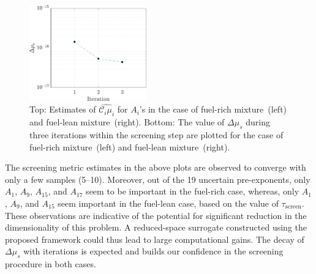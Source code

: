 \begin{figure}[htbp]
\begin{center}
  \includegraphics[width=0.45\textwidth]{./Figures/mu_lean}
\caption{Top: Estimates of $\widehat{\mathcal{C}_i\mu_i}$ for $A_i$'s in the case
of fuel-rich mixture~(left) and fuel-lean mixture~(right). Bottom: The value of
$\Delta\mu_s$ during three iterations within the screening step are plotted for
the case of fuel-rich mixture~(left) and fuel-lean mixture~(right).}
\label{fig:sense_kinetics}
\end{center}
\end{figure}
%
The screening metric estimates in the above plots are observed to converge with
only a few samples (5--10). Moreover, out of the 19 uncertain pre-exponents,
only $A_1$, $A_9$, $A_{15}$, and $A_{17}$ seem to be important in the fuel-rich
case, whereas, only $A_1$, $A_9$, and $A_{15}$ seem important in the fuel-lean
case, based on the value of $\tau_\text{screen}$. These observations are indicative
of the potential for significant reduction in the dimensionality of this problem. 
A reduced-space
surrogate constructed using the proposed framework could thus lead to large computational
gains. The decay of $\Delta\mu_s$ with iterations is expected and builds our confidence
in the screening procedure in both cases.


